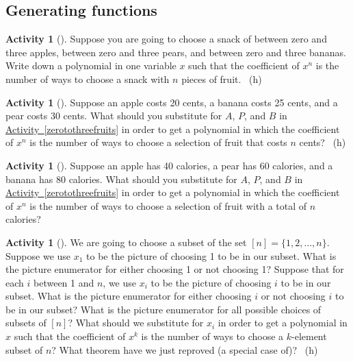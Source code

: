 \documentclass[10pt,]{book}
\theoremstyle{plain}
\theoremstyle{definition}
\theoremstyle{definition}
\theoremstyle{definition}
\newtheorem{activity}[project]{Activity}
\numberwithin{equation}{chapter}
\begin{document}
\subsection[{Generating functions}]{Generating functions}\label{subsection-32}
\begin{activity}[]\label{activity-234}
\hypertarget{p-1269}{}%
Suppose you are going to choose a snack of between zero and three apples, between zero and three pears, and between zero and three bananas. Write down a polynomial in one variable \(x\) such that the coefficient of \(x^n\) is the number of ways to choose a snack with \(n\) pieces of fruit.%
~{\tiny (h)}\end{activity}
\begin{activity}[]\label{activity-235}
\hypertarget{p-1272}{}%
Suppose an apple costs 20 cents, a banana costs 25 cents, and a pear costs 30 cents. What should you substitute for \(A\), \(P\), and \(B\) in \hyperref[zerotothreefruits]{Activity~\ref{zerotothreefruits}} in order to get a polynomial in which the coefficient of \(x^n\) is the number of ways to choose a selection of fruit that costs \(n\) cents?%
~{\tiny (h)}\end{activity}
\begin{activity}[]\label{activity-236}
\hypertarget{p-1275}{}%
Suppose an apple has 40 calories, a pear has 60 calories, and a banana has 80 calories. What should you substitute for \(A\), \(P\), and \(B\) in \hyperref[zerotothreefruits]{Activity~\ref{zerotothreefruits}} in order to get a polynomial in which the coefficient of \(x^n\) is the number of ways to choose a selection of fruit with a total of \(n\) calories?%
\end{activity}
\begin{activity}[]\label{reprovingbinomialtheorem}
\hypertarget{p-1277}{}%
We are going to choose a subset of the set \([n]=\{1,2,\ldots, n\}\). Suppose we use \(x_1\) to be the picture of choosing 1 to be in our subset. What is the picture enumerator for either choosing 1 or not choosing 1? Suppose that for each \(i\) between 1 and \(n\), we use \(x_i\) to be the picture of choosing \(i\) to be in our subset. What is the picture enumerator for either choosing \(i\) or not choosing \(i\) to be in our subset? What is the picture enumerator for all possible choices of subsets of \([n]\)? What should we substitute for \(x_i\) in order to get a polynomial in \(x\) such that the coefficient of \(x^k\) is the number of ways to choose a \(k\)-element subset of \(n\)? What theorem have we just reproved (a special case of)?%
~{\tiny (h)}\end{activity}
\end{document}
